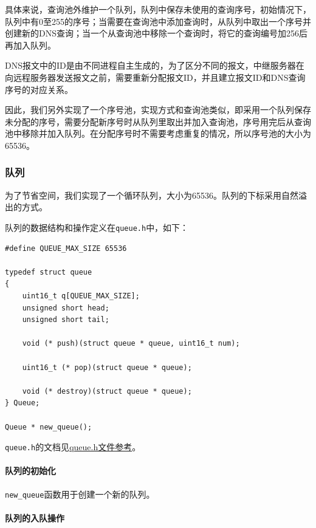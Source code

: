 \documentclass[lang=cn,11pt,a4paper,cite=authornum]{paper}
\begin{document}
具体来说，查询池外维护一个队列，队列中保存未使用的查询序号，初始情况下，队列中有0至255的序号；当需要在查询池中添加查询时，从队列中取出一个序号并创建新的DNS查询；当一个从查询池中移除一个查询时，将它的查询编号加256后再加入队列。

DNS报文中的ID是由不同进程自主生成的，为了区分不同的报文，中继服务器在向远程服务器发送报文之前，需要重新分配报文ID，并且建立报文ID和DNS查询序号的对应关系。

因此，我们另外实现了一个序号池，实现方式和查询池类似，即采用一个队列保存未分配的序号，需要分配新序号时从队列里取出并加入查询池，序号用完后从查询池中移除并加入队列。在分配序号时不需要考虑重复的情况，所以序号池的大小为65536。

\subsubsection{队列}

为了节省空间，我们实现了一个循环队列，大小为65536。队列的下标采用自然溢出的方式。

队列的数据结构和操作定义在\texttt{queue.h}中，如下：

\begin{code}
\begin{verbatim}
#define QUEUE_MAX_SIZE 65536

typedef struct queue
{
    uint16_t q[QUEUE_MAX_SIZE]; 
    unsigned short head; 
    unsigned short tail; 
    
    void (* push)(struct queue * queue, uint16_t num);
    
    uint16_t (* pop)(struct queue * queue);
    
    void (* destroy)(struct queue * queue);
} Queue;
 
Queue * new_queue();
\end{verbatim}
\end{code}

\texttt{queue.h}的文档见\href{run:./APIdoc/queue_8h.html}{queue.h文件参考}。

\paragraph{队列的初始化}

\texttt{new_queue}函数用于创建一个新的队列。

\paragraph{队列的入队操作}
\end{document}
